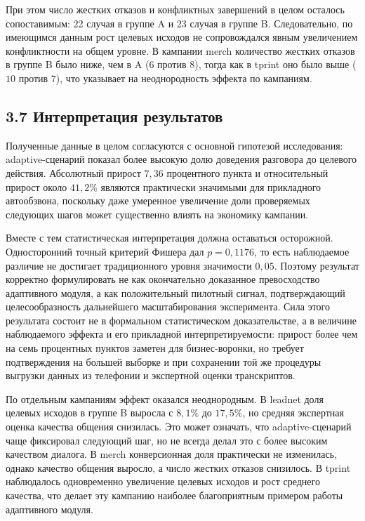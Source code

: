 \documentclass[a4paper,14pt]{extarticle}
\renewcommand{\texttt}[1]{\textnormal{#1}}
\begin{document}
При этом число жестких отказов и конфликтных завершений в целом осталось
сопоставимым: 22 случая в группе \texttt{A} и 23 случая в группе
\texttt{B}. Следовательно, по имеющимся данным рост целевых исходов не
сопровождался явным увеличением конфликтности на общем уровне. В
кампании \texttt{merch} количество жестких отказов в группе \texttt{B}
было ниже, чем в \texttt{A} (\(6\) против \(8\)), тогда как в
\texttt{tprint} оно было выше (\(10\) против \(7\)), что указывает на
неоднородность эффекта по кампаниям.

\subsection{3.7 Интерпретация
результатов}\label{ux438ux43dux442ux435ux440ux43fux440ux435ux442ux430ux446ux438ux44f-ux440ux435ux437ux443ux43bux44cux442ux430ux442ux43eux432}

Полученные данные в целом согласуются с основной гипотезой исследования:
adaptive-сценарий показал более высокую долю доведения разговора до
целевого действия. Абсолютный прирост \(7{,}36\) процентного пункта и
относительный прирост около \(41{,}2\%\) являются практически значимыми
для прикладного автообзвона, поскольку даже умеренное увеличение доли
проверяемых следующих шагов может существенно влиять на экономику
кампании.

Вместе с тем статистическая интерпретация должна оставаться осторожной.
Односторонний точный критерий Фишера дал \(p = 0{,}1176\), то есть
наблюдаемое различие не достигает традиционного уровня значимости
\(0{,}05\). Поэтому результат корректно формулировать не как
окончательно доказанное превосходство адаптивного модуля, а как
положительный пилотный сигнал, подтверждающий целесообразность
дальнейшего масштабирования эксперимента. Сила этого результата состоит
не в формальном статистическом доказательстве, а в величине наблюдаемого
эффекта и его прикладной интерпретируемости: прирост более чем на семь
процентных пунктов заметен для бизнес-воронки, но требует подтверждения
на большей выборке и при сохранении той же процедуры выгрузки данных из
телефонии и экспертной оценки транскриптов.

По отдельным кампаниям эффект оказался неоднородным. В \texttt{leadnet}
доля целевых исходов в группе \texttt{B} выросла с \(8{,}1\%\) до
\(17{,}5\%\), но средняя экспертная оценка качества общения снизилась.
Это может означать, что adaptive-сценарий чаще фиксировал следующий шаг,
но не всегда делал это с более высоким качеством диалога. В
\texttt{merch} конверсионная доля практически не изменилась, однако
качество общения выросло, а число жестких отказов снизилось. В
\texttt{tprint} наблюдалось одновременно увеличение целевых исходов и
рост среднего качества, что делает эту кампанию наиболее благоприятным
примером работы адаптивного модуля.
\end{document}
